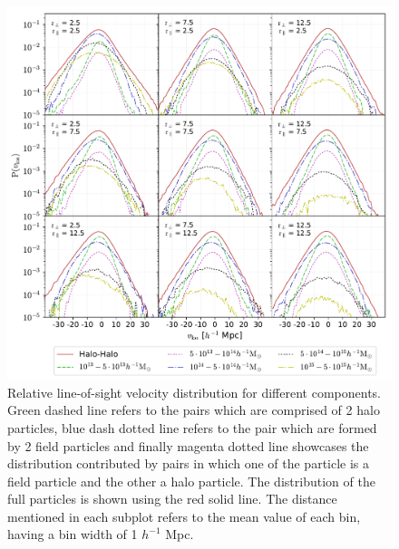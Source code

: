 \documentclass[a4paper,fleqn,usenatbib]{mnras}
\begin{document}
	
%	
	\begin{figure}
		\centering
		\includegraphics[scale=0.75]{rel_los_mass_components}
		\caption{Relative line-of-sight velocity distribution for different components. Green dashed line refers to the pairs which are comprised of 2 halo particles, blue dash dotted line refers to the pair which are formed by 2 field particles and finally magenta dotted line showcases the distribution contributed by pairs in which one of the particle is a field particle and the other a halo particle. The distribution of the full particles is shown using the red solid line. The distance mentioned in each subplot refers to the mean value of each bin, having a bin width of 1 $h^{-1}$ Mpc.}
		\label{fig:rel_los_mass_comp}
	\end{figure}
\end{document}
